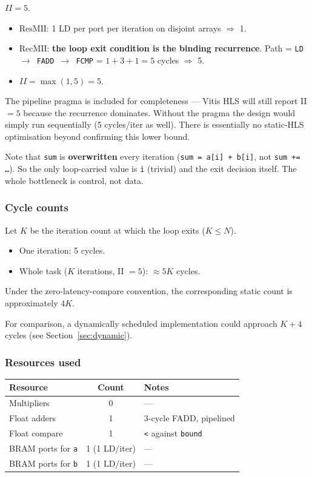 \documentclass[11pt,a4paper]{article}
\begin{document}
$II = 5$.

\begin{itemize}[noitemsep]
  \item $\mathrm{ResMII}$: 1 LD per port per iteration on disjoint arrays $\Rightarrow$ 1.
  \item $\mathrm{RecMII}$: \textbf{the loop exit condition is the binding recurrence}. Path = \texttt{LD $\to$ FADD $\to$ FCMP} = $1+3+1 = 5$ cycles $\Rightarrow$ 5.
  \item $II = \max(1, 5) = 5$.
\end{itemize}

The pipeline pragma is included for completeness --- Vitis HLS will still report II $=5$ because the recurrence dominates. Without the pragma the design would simply run sequentially (5 cycles/iter as well). There is essentially no static-HLS optimisation beyond confirming this lower bound.

Note that \texttt{sum} is \textbf{overwritten} every iteration (\texttt{sum = a[i] + b[i]}, not \texttt{sum += \dots}). So the only loop-carried value is \texttt{i} (trivial) and the exit decision itself. The whole bottleneck is control, not data.

\subsubsection*{Cycle counts}

Let $K$ be the iteration count at which the loop exits ($K \leq N$).

\begin{itemize}[noitemsep]
  \item One iteration: 5 cycles.
  \item Whole task ($K$ iterations, II $=5$): $\approx 5K$ cycles.
\end{itemize}

Under the zero-latency-compare convention, the corresponding static count is approximately $4K$.

For comparison, a dynamically scheduled implementation could approach $K+4$ cycles (see Section~\ref{sec:dynamic}).

\subsubsection*{Resources used}

\begin{center}
\begin{tabular}{lcl}
\toprule
Resource & Count & Notes \\
\midrule
Multipliers          & 0 & --- \\
Float adders         & 1 & 3-cycle FADD, pipelined \\
Float compare        & 1 & \texttt{\textless} against \texttt{bound} \\
BRAM ports for \texttt{a} & 1 (1 LD/iter) & --- \\
BRAM ports for \texttt{b} & 1 (1 LD/iter) & --- \\
\bottomrule
\end{tabular}
\end{center}
\end{document}
